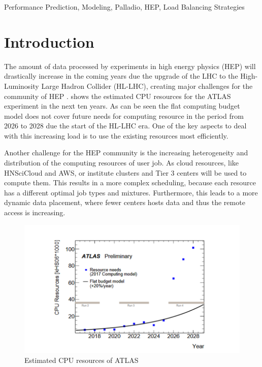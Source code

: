 \documentclass[runningheads,a4paper]{llncs}[2017/09/04]
\begin{document}
\begin{keywords}
  Performance Prediction,
  Modeling,
  Palladio,
  HEP,
  Load Balancing Strategies
\end{keywords}

\section{Introduction}
\label{sec:intro}

The amount of data processed by experiments in high energy physics (HEP) will drastically increase in the coming years due the upgrade of the LHC to the High-Luminosity Large Hadron Collider (HL-LHC), creating major challenges for the community of HEP \cite{community}.
 shows the estimated CPU resources for the ATLAS experiment in the next ten years. As can be seen the flat computing budget model does not cover future needs for computing resource in the period from 2026 to 2028 due the start of the HL-LHC era. One of the key aspects to deal with this increasing load is to use the existing resources most efficiently.

Another challenge for the HEP community is the increasing heterogeneity and distribution of the computing resources of user job. As cloud resources, like HNSciCloud and AWS, or institute clusters and Tier 3 centers will be used to compute them. This results in a more complex scheduling, because each resource has a different optimal job types and mixtures. Furthermore, this leads to a more dynamic data placement, where fewer centers hosts data and thus the remote access is increasing.

\begin{figure}
	\centering
	\includegraphics[width=1.0\linewidth]{images/resources}
	\caption[]{Estimated CPU resources of ATLAS \cite{community}}
	\label{resources}
\end{figure}
\end{document}
